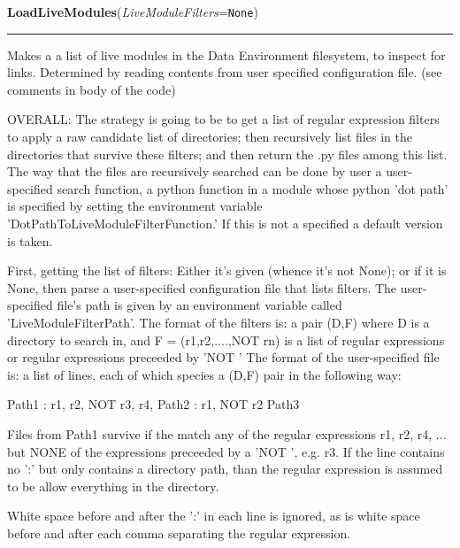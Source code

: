     \vspace{0.5ex}

\hspace{.8\funcindent}\begin{boxedminipage}{\funcwidth}

    \raggedright \textbf{LoadLiveModules}(\textit{LiveModuleFilters}={\tt None})

    \vspace{-1.5ex}

    \rule{\textwidth}{0.5\fboxrule}
\setlength{\parskip}{2ex}
    Makes a a list of live modules in the Data Environment filesystem, to 
    inspect for links.  Determined by reading contents from user specified 
    configuration file.  (see comments in body of the code)

    OVERALL: The strategy is going to be to get a list of regular 
    expression filters to apply a raw candidate list of directories; then 
    recursively list files in the directories that survive these filters; 
    and then return the .py files among this list.     The way that the 
    files are recursively searched can be done by user a user-specified 
    search function, a python function in a module whose python 'dot path' 
    is specified by setting the environment variable 
    'DotPathToLiveModuleFilterFunction.'  If this is not a specified a 
    default version is taken.

    First, getting the list of filters: Either it's given (whence it's not 
    None); or if it is None, then parse a user-specified configuration file
    that lists filters. The user-specified file's path is given by an 
    environment variable called 'LiveModuleFilterPath'. The format of the 
    filters is:  a pair (D,F) where D is a directory to search in, and F = 
    (r1,r2,....,NOT rn) is a list of regular expressions or regular 
    expressions preceeded by 'NOT ' The format of the user-specified file 
    is:  a list of lines, each of which species a (D,F) pair in the 
    following way:

    Path1 : r1, r2, NOT r3, r4, Path2 : r1, NOT r2 Path3

    Files from Path1 survive if the match any of the regular expressions 
    r1, r2, r4, ... but NONE of the expressions preceeded by a  'NOT ', 
    e.g. r3. If the line contains no ':' but only contains a directory 
    path, than the regular expression is assumed to be allow everything in 
    the directory.

    White space before and after the ':' in each line is ignored, as is 
    white space before and after each comma separating the regular 
    expression.


\end{boxedminipage}
